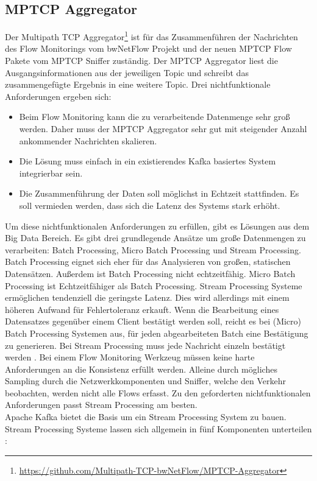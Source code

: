 \documentclass[a4paper, 12pt]{article}
\begin{document}
\subsection{MPTCP Aggregator}
Der Multipath TCP Aggregator\footnote{\url{https://github.com/Multipath-TCP-bwNetFlow/MPTCP-Aggregator}} ist für das Zusammenführen der Nachrichten des Flow Monitorings vom bwNetFlow Projekt und der neuen MPTCP Flow Pakete vom MPTCP Sniffer zuständig. Der MPTCP Aggregator liest die Ausgangsinformationen aus der jeweiligen Topic und schreibt das zusammengefügte Ergebnis in eine weitere Topic.
Drei nichtfunktionale Anforderungen ergeben sich:
\begin{itemize}
\item Beim Flow Monitoring kann die zu verarbeitende Datenmenge sehr groß werden. Daher muss der MPTCP Aggregator sehr gut mit steigender Anzahl ankommender Nachrichten skalieren.
\item Die Lösung muss einfach in ein existierendes Kafka basiertes System integrierbar sein.
\item Die Zusammenführung der Daten soll möglichst in Echtzeit stattfinden. Es soll vermieden werden, dass sich die Latenz des Systems stark erhöht.
\end{itemize}

Um diese nichtfunktionalen Anforderungen zu erfüllen, gibt es Lösungen aus dem Big Data Bereich.
Es gibt drei grundlegende Ansätze um große Datenmengen zu verarbeiten: Batch Processing, Micro Batch Processing und Stream Processing.
Batch Processing eignet sich eher für das Analysieren von großen, statischen Datensätzen. Außerdem ist Batch Processing nicht echtzeitfähig. 
Micro Batch Processing ist Echtzeitfähiger als Batch Processing. Stream Processing Systeme ermöglichen tendenziell die geringste Latenz. Dies wird allerdings mit einem höheren Aufwand für Fehlertoleranz erkauft.
Wenn die Bearbeitung eines Datensatzes gegenüber einem Client bestätigt werden soll, reicht es bei (Micro) Batch Processing Systemen aus, für jeden abgearbeiteten Batch eine Bestätigung zu generieren. Bei Stream Processing muss jede Nachricht einzeln bestätigt werden \cite{lopez2016performance}. 
Bei einem Flow Monitoring Werkzeug müssen keine harte Anforderungen an die Konsistenz erfüllt werden. Alleine durch mögliches Sampling durch die Netzwerkkomponenten und Sniffer, welche den Verkehr beobachten, werden nicht alle Flows erfasst.
Zu den geforderten nichtfunktionalen Anforderungen passt Stream Processing am besten.
\\
Apache Kafka bietet die Basis um ein Stream Processing System zu bauen. 
Stream Processing Systeme lassen sich allgemein in fünf Komponenten unterteilen \cite{isah2019survey}:
 
\end{document}
